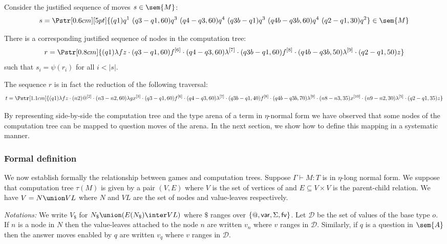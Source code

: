 Consider the justified sequence of moves $s \in \sem{M}$:
 $$s = \Pstr[0.6cm][5pt]{(q1){q}^1\ (q3-q1,60){q}^3\ (q4-q3,60){q}^4\ (q3b-q1){q}^3\ (q4b-q3b,60){q}^4\ (q2-q1,30){q}^2 }
\in \sem{M}$$

There is a corresponding justified sequence of nodes in the computation tree:
$$r = \Pstr[0.8cm]{
        (q1){\lambda f z} \cdot
        (q3-q1,60){f}^{[6]} \cdot
        (q4-q3,60){\lambda^{[7]}} \cdot
        (q3b-q1,60){f}^{[8]} \cdot
        (q4b-q3b,50){\lambda^{[9]}} \cdot
        (q2-q1,50){z} }$$
such that $s_i = \psi(r_i)$ for all $i < |s|$.

The sequence $r$ is in fact the reduction of the following
traversal:
$$t = \Pstr[1.1cm]{ (q1){\lambda f z} \cdot
            (n2){@^{[2]}} \cdot (n3-n2,60){\lambda g x^{[3]}} \cdot
            (q3-q1,60){f}^{[6]} \cdot (q4-q3,60){\lambda^{[7]}} \cdot
            (q3b-q1,40){f}^{[8]} \cdot (q4b-q3b,70){\lambda^{[9]}} \cdot
            (n8-n3,35){x^{[10]}} \cdot
            (n9-n2,30){\lambda^{[5]}} \cdot
            (q2-q1,35){z} }
$$

By representing side-by-side the computation tree and the type arena of a term in $\eta$-normal form we have observed
that some nodes of the computation tree can be mapped to question moves of the arena.
In the next section, we show how to define this mapping in a systematic manner.

\subsubsection{Formal definition}

We now establish formally the relationship between games and computation trees. Suppose $\Gamma \vdash M : T$
is in $\eta$-long normal form. We suppose that computation tree $\tau(M)$
is given by a pair $(V,E)$ where $V$ is the set of vertices of
and $E \subseteq V \times V$ is the parent-child relation. We have $V = N \union VL$ where $N$
and $VL$ are the set of nodes and value-leaves respectively.

\emph{Notations:}
We write $V_\$$ for $N_\$ \union (E(N_\$) \inter VL)$ where $\$$ ranges over $\{@, {\sf var}, \Sigma, {\sf fv} \}$.
Let $\mathcal{D}$ be the set of values of the base type $o$. If $n$ is a node in $N$ then the value-leaves attached to the node $n$ are written $v_n$ where $v$ ranges in $\mathcal{D}$.
Similarly, if $q$ is a question in $\sem{A}$ then the answer moves enabled by $q$ are written $v_q$ where $v$ ranges in $\mathcal{D}$.

